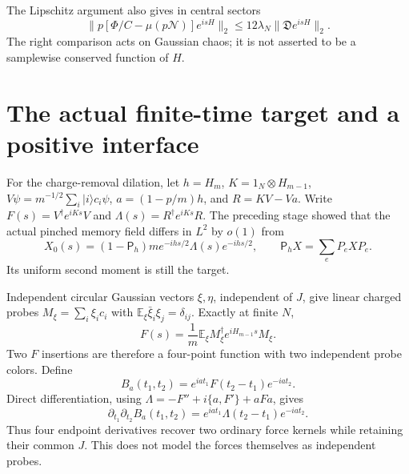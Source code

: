 \documentclass[11pt,a4paper]{article}
\newcommand{\EE}{\mathbb E}
\begin{document}
The Lipschitz argument also gives in central sectors
\begin{equation}
 \|p[\Phi/C-\mu(p\mathcal N)]e^{isH}\|_2
 \le12\lambda_N\|\mathfrak D e^{isH}\|_2.\label{eq:ordinaryfilter}
\end{equation}
The right comparison acts on Gaussian chaos; it is not asserted
to be a samplewise conserved function of $H$.

\newpage
\section{The actual finite-time target and a positive interface}
For the charge-removal dilation, let $h=H_m$, $K=1_N\otimes H_{m-1}$,
$V\psi=m^{-1/2}\sum_i|i\rangle c_i\psi$, $a=(1-p/m)h$, and
$R=KV-Va$. Write $F(s)=V^\dagger e^{iKs}V$ and
$\Lambda(s)=R^\dagger e^{iKs}R$.
The preceding stage showed that the actual pinched memory field
differs in $L^2$ by $o(1)$ from
\begin{equation}
 X_0(s)=(1-\mathsf P_h)m e^{-ihs/2}\Lambda(s)e^{-ihs/2},
 \qquad \mathsf P_hX=\sum_eP_eXP_e.
\end{equation}
Its uniform second moment is still the target.

Independent circular Gaussian vectors $\xi,\eta$, independent of
$J$, give linear charged probes $M_\xi=\sum_i\xi_i c_i$ with
$\EE_\xi\bar\xi_i\xi_j=\delta_{ij}$. Exactly at finite $N$,
\begin{equation}
 F(s)=\frac1m\EE_\xi M_\xi^\dagger e^{iH_{m-1}s}M_\xi.
\end{equation}
Two $F$ insertions are therefore a four-point function with two
independent probe colors. Define
\begin{equation}
 B_a(t_1,t_2)=e^{iat_1}F(t_2-t_1)e^{-iat_2}.
\end{equation}
Direct differentiation, using $\Lambda=-F''+i\{a,F'\}+aFa$, gives
\begin{equation}
 \partial_{t_1}\partial_{t_2}B_a(t_1,t_2)
 =e^{iat_1}\Lambda(t_2-t_1)e^{-iat_2}.\label{eq:probe}
\end{equation}
Thus four endpoint derivatives recover two ordinary force kernels
while retaining their common $J$. This does not model the forces
themselves as independent probes.
\end{document}
